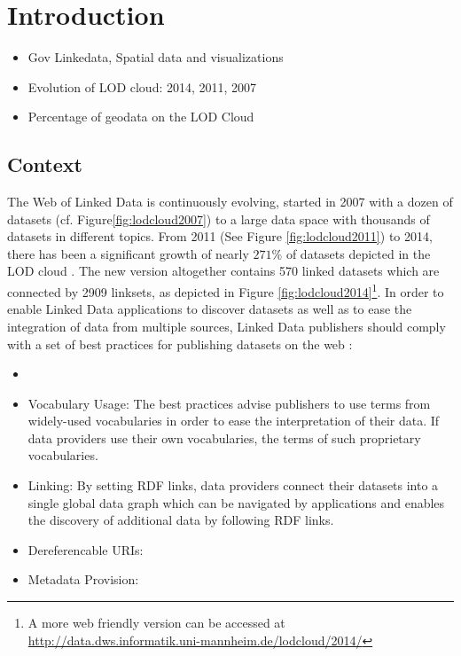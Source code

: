 \chapter{Introduction}
\label{intro}

\begin{itemize}
\item Gov Linkedata, Spatial data and visualizations
\item Evolution of LOD cloud: 2014, 2011, 2007
\item Percentage of geodata on the LOD Cloud
\end{itemize}

\section{Context}
\label{sec:context}

The Web of Linked Data is continuously evolving, started in 2007 with a dozen of datasets (cf. Figure\ref{fig:lodcloud2007}) to a large data space with thousands of datasets in different topics. From 2011 (See Figure \ref{fig:lodcloud2011})\cite{jentzsch2011} to 2014, there has been a significant growth of nearly $271\%$ of datasets depicted in the LOD cloud \cite{max2014}. The new version altogether contains 570 linked datasets which are connected by 2909 linksets, as depicted in Figure \ref{fig:lodcloud2014}\footnote{A more web friendly version can be accessed at \url{http://data.dws.informatik.uni-mannheim.de/lodcloud/2014/}}. In order to enable
Linked Data applications to discover datasets as well as to ease the integration of data from multiple sources, Linked Data publishers should comply with a set of best practices for publishing datasets on the web \cite{Heath2011}:

\begin{itemize}
\item {}

\item Vocabulary Usage: The best practices advise publishers to use terms from
widely-used vocabularies in order to ease the interpretation of their data. If data providers use their own vocabularies, the terms of such proprietary vocabularies.

\item Linking: By setting RDF links, data providers connect their datasets into a single global data graph which can be navigated by applications and enables the discovery of additional data by following RDF links.

\item Dereferencable URIs:  

\item Metadata Provision: 
\end{itemize}



